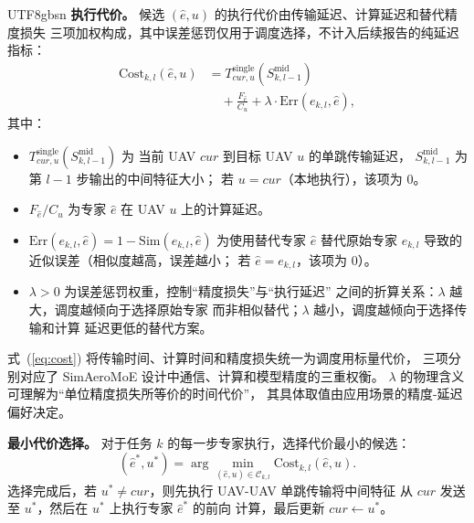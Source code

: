 \documentclass[conference]{IEEEtran}
\begin{document}
\begin{CJK*}{UTF8}{gbsn}
\textbf{执行代价。}
候选 $(\hat{e},u)$ 的执行代价由传输延迟、计算延迟和替代精度损失
三项加权构成，其中误差惩罚仅用于调度选择，不计入后续报告的纯延迟指标：
\begin{equation}
\begin{aligned}
\mathrm{Cost}_{k,l}(\hat{e},u) &=
T_{cur,u}^{\mathrm{single}}\!\left(S_{k,l-1}^{\mathrm{mid}}\right) \\
&\quad + \frac{F_{\hat{e}}}{C_u}
+ \lambda \cdot \mathrm{Err}(e_{k,l}, \hat{e}),
\end{aligned}
\label{eq:cost}
\end{equation}
其中：
\begin{itemize}
  \item $T_{cur,u}^{\mathrm{single}}(S_{k,l-1}^{\mathrm{mid}})$ 为
        当前 UAV $cur$ 到目标 UAV $u$ 的单跳传输延迟，
        $S_{k,l-1}^{\mathrm{mid}}$ 为第 $l-1$ 步输出的中间特征大小；
        若 $u=cur$（本地执行），该项为 $0$。
  \item $F_{\hat{e}}/C_u$ 为专家 $\hat{e}$ 在 UAV $u$ 上的计算延迟。
  \item $\mathrm{Err}(e_{k,l},\hat{e}) =
        1 - \mathrm{Sim}(e_{k,l},\hat{e})$ 为使用替代专家 $\hat{e}$
        替代原始专家 $e_{k,l}$ 导致的近似误差（相似度越高，误差越小；
        若 $\hat{e}=e_{k,l}$，该项为 $0$）。
  \item $\lambda > 0$ 为误差惩罚权重，控制``精度损失''与``执行延迟''
        之间的折算关系：$\lambda$ 越大，调度越倾向于选择原始专家
        而非相似替代；$\lambda$ 越小，调度越倾向于选择传输和计算
        延迟更低的替代方案。
\end{itemize}

式~(\ref{eq:cost}) 将传输时间、计算时间和精度损失统一为调度用标量代价，
三项分别对应了 SimAeroMoE 设计中通信、计算和模型精度的三重权衡。
$\lambda$ 的物理含义可理解为``单位精度损失所等价的时间代价''，
其具体取值由应用场景的精度-延迟偏好决定。

\textbf{最小代价选择。}
对于任务 $k$ 的每一步专家执行，选择代价最小的候选：
\begin{equation}
(\hat{e}^*, u^*) = \arg\min_{(\hat{e},u)\in\mathcal{C}_{k,l}}
\mathrm{Cost}_{k,l}(\hat{e},u).
\label{eq:min_cost}
\end{equation}
选择完成后，若 $u^* \neq cur$，则先执行 UAV-UAV 单跳传输将中间特征
从 $cur$ 发送至 $u^*$，然后在 $u^*$ 上执行专家 $\hat{e}^*$ 的前向
计算，最后更新 $cur \leftarrow u^*$。


\end{CJK*}
\end{document}
